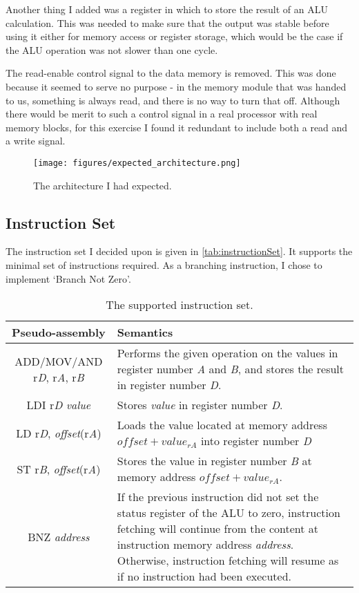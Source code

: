\documentclass[11pt]{article}
\begin{document}
Another thing I added was a register in which to store the result of
an ALU calculation. This was needed to make sure that the output was
stable before using it either for memory access or register storage,
which would be the case if the ALU operation was not slower than one
cycle.

The read-enable control signal to the data memory is removed. This was
done because it seemed to serve no purpose - in the memory module that
was handed to us, something is always read, and there is no way to
turn that off. Although there would be merit to such a control signal
in a real processor with real memory blocks, for this exercise I found
it redundant to include both a read and a write signal.

\begin{figure}[ht]
  \centering
  \texttt{[image: figures/expected\_architecture.png]}
  \caption{\label{fig:expectedArchitecture} The architecture I had expected.}
\end{figure}


\subsection{Instruction Set}
\label{subsec:instructionSet}
The instruction set I decided upon is given in
\autoref{tab:instructionSet}. It supports the minimal set of
instructions required. As a branching instruction, I chose to
implement `Branch Not Zero'. 

\begin{table}[htbp]
  \centering
  \begin{tabular}{|c|p{190pt}|}
    \hline
    {\bf Pseudo-assembly} & {\bf Semantics} \\ \hline
    ADD/MOV/AND r{\em D}, r{\em A}, r{\em B} &  Performs the given operation on the values in register number {\em A} and {\em B}, and stores the result in register number {\em D}. \\ \hline
    LDI r{\em D} {\em value} & Stores {\em value} in register number {\em D}. \\ \hline
    LD r{\em D}, {\em offset}(r{\em A}) & Loads the value located at memory address $offset + value_{rA}$ into register number {\em D} \\ \hline
    ST r{\em B}, {\em offset}(r{\em A}) & Stores the value in register number {\em B} at memory address $offset + value_{rA}$. \\ \hline
    BNZ {\em address} & If the previous instruction did not set the status register of the ALU to zero, instruction fetching will continue from the content at instruction memory address {\em address}. Otherwise, instruction fetching will resume as if no instruction had been executed. \\ \hline
  \end{tabular}
  \caption{The supported instruction set.}
  \label{tab:instructionSet}
\end{table}
\end{document}

